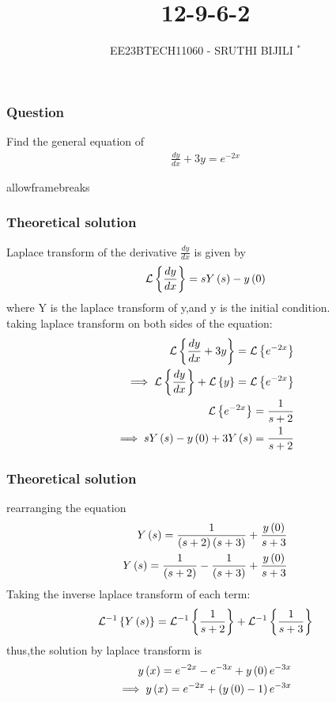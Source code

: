 \documentclass{beamer}
\begin{document}
\title{12-9-6-2}
\author{EE23BTECH11060 - SRUTHI BIJILI $^{*}$}
\date{}
\frame{\titlepage}

\begin{frame}
\frametitle{Question}
Find the general equation of 
\begin{align}
    \frac{dy}{dx}+3y=e^{-2x}
\end{align}
\end{frame}
\begin{frame}{allowframebreaks}
\frametitle{Theoretical solution}
Laplace transform of the derivative $\frac{dy}{dx}$ is given by 
\begin{align}
    \mathcal{L}\left\{\frac{dy}{dx}\right\}=sY\left(s\right)-y\left(0\right)
\end{align}
where Y is the laplace transform of y,and y is the initial condition.\\
taking laplace transform on both sides of the equation:
\begin{align}
    \mathcal{L}\left\{\frac{dy}{dx}+3y\right\}=\mathcal{L}\left\{e^{-2x}\right\}\\
    \implies \mathcal{L}\left\{\frac{dy}{dx}\right\}+\mathcal{L}\left\{y\right\}=\mathcal{L}\left\{e^{-2x}\right\}\\
    \mathcal{L}\left\{e^{-2x}\right\}=\frac{1}{s+2}\\
    \implies sY\left(s\right)-y\left(0\right)+3Y\left(s\right)=\frac{1}{s+2}
\end{align}
\end{frame}
\begin{frame}
\frametitle{Theoretical solution}
rearranging the equation 
\begin{align}
    Y\left(s\right)=\frac{1}{\left(s+2\right)\left(s+3\right)}+\frac{y\left(0\right)}{s+3}\\
     Y\left(s\right)=\frac{1}{\left(s+2\right)}-\frac{1}{\left(s+3\right)}+\frac{y\left(0\right)}{s+3}
\end{align}
Taking the inverse laplace transform of each term:
\begin{align}
    \mathcal{L}^{-1}\left\{Y\left(s\right)\right\}=\mathcal{L}^{-1}\left\{\frac{1}{s+2}\right\}+\mathcal{L}^{-1}\left\{\frac{1}{s+3}\right\}
\end{align}
thus,the solution by laplace transform is 
\begin{align}
    y\left(x\right)=e^{-2x}-e^{-3x}+y\left(0\right)e^{-3x}\\
    \implies  y\left(x\right)=e^{-2x}+\left(y\left(0\right)-1\right)e^{-3x}\\
\end{align}
\end{frame}
\end{document}
